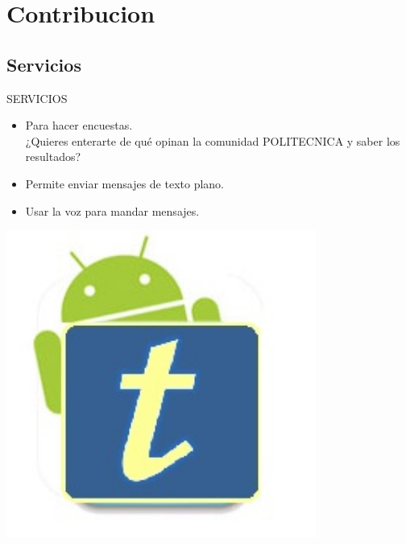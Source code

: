 \documentclass{beamer}
\begin{document}
	\section{Contribucion}
		\subsection{Servicios}
		\begin{frame}{SERVICIOS}
			\begin{itemize}[<+->]
				\item 
					Para hacer encuestas.\\
					¿Quieres enterarte de qué opinan la comunidad POLITECNICA y saber los resultados?
				\item
					Permite enviar mensajes de texto plano.
				\item
					Usar la voz para mandar mensajes.
			\end{itemize}
			\begin{center}
				\includegraphics[totalheight=1.2in,width=4in]{TAndroid}
			\end{center}
		\end{frame}
		
\end{document}
